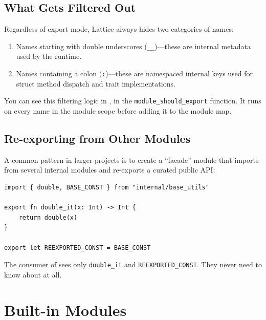 \subsection{What Gets Filtered Out}\label{subsec:export-filtering}

Regardless of export mode, Lattice always hides two categories of names:

\begin{enumerate}
  \item Names starting with double underscores (\lstinline|__|)---these are internal metadata used by the runtime.
  \item Names containing a colon (\lstinline|:|)---these are namespaced internal keys used for struct method dispatch and trait implementations.
\end{enumerate}

You can see this filtering logic in , in the \lstinline|module_should_export| function.
It runs on every name in the module scope before adding it to the module map.

\subsection{Re-exporting from Other Modules}\label{subsec:re-exporting}

A common pattern in larger projects is to create a ``facade'' module that imports from several internal modules and re-exports a curated public API\@:

\begin{lstlisting}[language=Lattice, caption={api.lat --- re-exporting a clean interface}]
import { double, BASE_CONST } from "internal/base_utils"

export fn double_it(x: Int) -> Int {
    return double(x)
}

export let REEXPORTED_CONST = BASE_CONST
\end{lstlisting}

The consumer of  sees only \lstinline|double_it| and \lstinline|REEXPORTED_CONST|.
They never need to know about  at all.

\section{Built-in Modules}\label{sec:builtin-modules}

